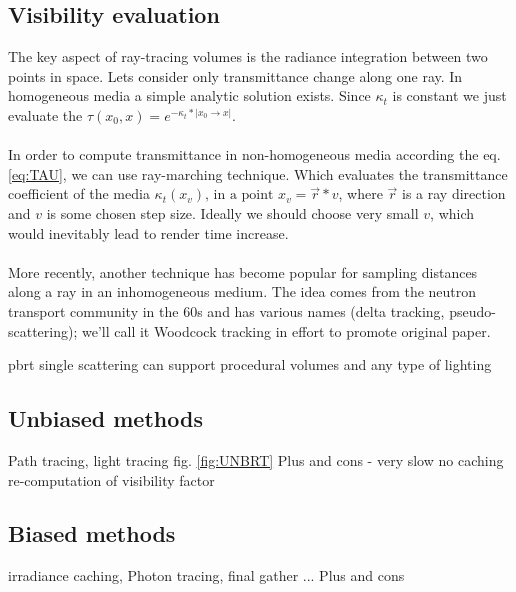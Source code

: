
\subsection{Visibility evaluation}
The key aspect of ray-tracing volumes is the radiance integration between two points in space. Lets consider only transmittance change along one ray. In homogeneous media a simple analytic solution exists. Since $\kappa_t$ is constant we just evaluate the $  \tau(x_{0},x)=e^{-\kappa_t*\left | x_{0}\rightarrow x \right |}$.
\\
\\
In order to compute transmittance in non-homogeneous media according the eq. \ref{eq:TAU}, we can use ray-marching technique. Which evaluates the transmittance coefficient of the media $\kappa_t(x_{v})\text{, in a point }x_{v}=\vec{r}*v$, where $\vec{r}$ is a ray direction and $v$ is some chosen step size. Ideally we should choose very small $v$, which would inevitably lead to render time increase. 
\\
\\
More recently, another technique has become popular for sampling distances along a ray in an inhomogeneous medium. The idea comes from the neutron transport community in the 60s and has various names (delta tracking, pseudo-scattering); we'll call it Woodcock tracking in effort to promote original paper.

pbrt single scattering
can support procedural volumes and any type of lighting

\subsection{Unbiased methods}


Path tracing, light tracing fig. \ref{fig:UNBRT}
Plus and cons - very slow no caching re-computation of visibility factor

\subsection{Biased methods}

\cite{jarosz08thesis} %
irradiance caching, Photon tracing, final gather ...
Plus and cons

